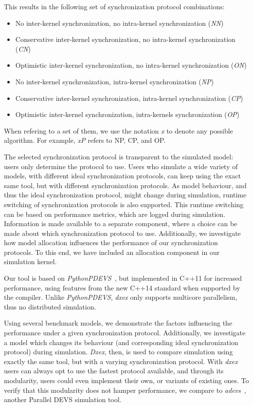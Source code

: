 This results in the following set of synchronization protocol combinations:
\begin{itemize}
\item No inter-kernel synchronization, no intra-kernel synchronization (\textit{NN})
\item Conservative inter-kernel synchronization, no intra-kernel synchronization (\textit{CN})
\item Optimistic inter-kernel synchronization, no intra-kernel synchronization (\textit{ON})
\item No inter-kernel synchronization, \pSim intra-kernel synchronization (\textit{NP})
\item Conservative inter-kernel synchronization, \pSim intra-kernel synchronization (\textit{CP})
\item Optimistic inter-kernel synchronization, \pSim intra-kernels synchronization (\textit{OP})
\end{itemize}

When refering to a set of them, we use the notation \textit{x} to denote any possible algorithm.
For example, \textit{xP} refers to NP, CP, and OP.

The selected synchronization protocol is transparent to the simulated model: users only determine the protocol to use.
Users who simulate a wide variety of models, with different ideal synchronization protocols, can keep using the exact same tool, but with different synchronization protocols.
As model behaviour, and thus the ideal synchronization protocol, might change during simulation, runtime switching of synchronization protocols is also supported.
This runtime switching can be based on performance metrics, which are logged during simulation.
Information is made available to a separate component, where a choice can be made about which synchronization protocol to use. %
Additionally, we investigate how model allocation influences the performance of our synchronization protocols.
To this end, we have included an allocation component in our simulation kernel.

Our tool is based on \textit{PythonPDEVS}~\cite{PythonPDEVS}, but implemented in C++11 for increased performance, using features from the new C++14 standard when supported by the compiler.
Unlike \textit{PythonPDEVS}, \textit{dxex} only supports multicore parallelism, thus no distributed simulation.

Using several benchmark models, we demonstrate the factors influencing the performance under a given synchronization protocol.
Additionally, we investigate a model which changes its behaviour (and corresponding ideal synchronization protocol) during simulation.
\textit{Dxex}, then, is used to compare simulation using exactly the same tool, but with a varying synchronization protocol.
With \textit{dxex} users can always opt to use the fastest protocol available, and through its modularity, users could even implement their own, or variants of existing ones.
To verify that this modularity does not hamper performance, we compare to \textit{adevs}~\cite{adevs}, another \textsf{Parallel DEVS} simulation tool.

